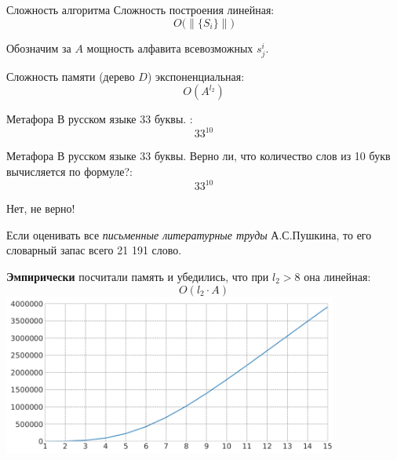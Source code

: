 \begin{frame}{Сложность алгоритма}
	Сложность построения линейная:
	\begin{equation}
	O \big( \lVert \{ S_i\} \rVert \big)
	\end{equation}
	
	Обозначим за $A$ мощность алфавита всевозможных $s_j^i$.
	 
	Сложность памяти (дерево $D$) экспоненциальная: 
	\begin{equation}
	O(A^{l_2})
	\end{equation}
	
\end{frame}

\begin{frame}{Метафора}
	В русском языке 33 буквы. :
	\begin{equation*}
	33^{10}
	\end{equation*}
	
	\LARGE
	\centering
\end{frame}

\begin{frame}{Метафора}
	В русском языке 33 буквы. Верно ли, что количество слов из 10
	букв вычисляется по формуле?:
	\begin{equation*}
	33^{10}
	\end{equation*}
	
	Нет, не верно! 
	
	Если оценивать все \textit{письменные литературные труды} А.С.Пушкина,
	то его словарный запас всего 21 191 слово.
\end{frame}

\begin{frame}
	\textbf{Эмпирически} посчитали память и убедились, что при $l_2 > 8$ она линейная:
	\begin{equation}
	O(l_2 \cdot A)
	\end{equation}
	\includegraphics[width=11cm]{../pic/beh/O_memory.png}
\end{frame}

